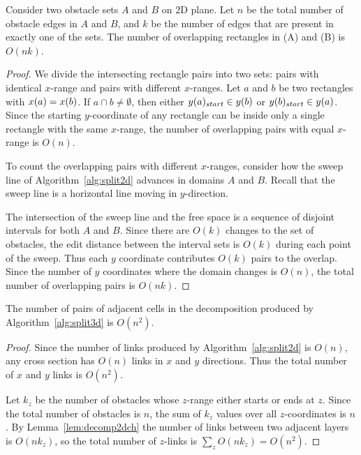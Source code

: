 \documentclass[english,gradu]{tktltiki2018}
\begin{document}
\begin{lem}\label{lem:decomp2dch}
Consider two obstacle sets $A$ and $B$ on 2D plane.
Let $n$ be the total number of obstacle edges in $A$ and $B$, and $k$ be the number of edges that are present in exactly one of the sets.
The number of overlapping rectangles in (A) and (B) is $O(nk)$.
\end{lem}
\begin{proof}
We divide the intersecting rectangle pairs into two sets:
pairs with identical $x$-range and pairs with different $x$-ranges.
Let $a$ and $b$ be two rectangles with $x(a)=x(b)$.
If $a\cap b\neq\emptyset$, then either $y(a)_{start}\in y(b)$ or $y(b)_{start}\in y(a)$.
Since the starting $y$-coordinate of any rectangle can be inside only a single rectangle with the same $x$-range, the number of overlapping pairs with equal $x$-range is $O(n)$.

To count the overlapping pairs with different $x$-ranges, consider how the sweep line of Algorithm~\ref{alg:split2d} advances in domains $A$ and $B$.
Recall that the sweep line is a horizontal line moving in $y$-direction.

The intersection of the sweep line and the free space is a sequence of disjoint intervals for both $A$ and $B$.
Since there are $O(k)$ changes to the set of obstacles, the edit distance between the interval sets is $O(k)$ during each point of the sweep.
Thus each $y$ coordinate contributes $O(k)$ pairs to the overlap.
Since the number of $y$ coordinates where the domain changes is $O(n)$, the total number of overlapping pairs is $O(nk)$.
\end{proof}

\begin{lem}\label{lem:split3dcount}The number of pairs of adjacent cells in the decomposition produced by Algorithm~\ref{alg:split3d} is $O(n^2)$.\end{lem}
\begin{proof}
Since the number of links produced by Algorithm~\ref{alg:split2d} is $O(n)$, any cross section has $O(n)$ links in $x$ and $y$ directions.
Thus the total number of $x$ and $y$ links is $O(n^2)$.

Let $k_z$ be the number of obstacles whose $z$-range either starts or ends at $z$.
Since the total number of obstacles is $n$, the sum of $k_z$ values over all $z$-coordinates is $n$.
By Lemma~\ref{lem:decomp2dch} the number of links between two adjacent layers is $O(nk_z)$, so the total number of $z$-links is $\sum_z O(nk_z)=O(n^2)$.
\end{proof}
\end{document}
